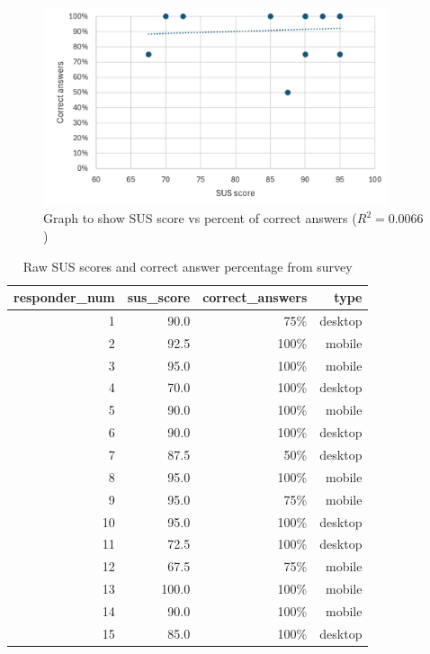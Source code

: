 \begin{figure}[H]
    \centering
    \includegraphics[width=0.9\textwidth]{contents/appendix/fig5/answer-sus-correlation.png}
    \caption{Graph to show SUS score vs percent of correct answers ($R^2 = 0.0066$)}
    \label{fig:sus-correlation}
\end{figure}

\begin{table}[ht]
  \centering
  \begin{tabular}{r r r r}
    \hline
    responder\_num & sus\_score & correct\_answers & type\\
    \hline
    1  &  90.0  & 75\%  & desktop\\
    2  &  92.5  & 100\% & mobile\\
    3  &  95.0  & 100\% & mobile\\
    4  &  70.0  & 100\% & desktop\\
    5  &  90.0  & 100\% & mobile\\
    6  &  90.0  & 100\% & desktop\\
    7  &  87.5  & 50\%  & desktop\\
    8  &  95.0  & 100\% & mobile\\
    9  &  95.0  & 75\%  & mobile\\
    10 &  95.0  & 100\% & desktop\\
    11 &  72.5  & 100\% & desktop\\
    12 &  67.5  & 75\%  & mobile\\
    13 & 100.0  & 100\% & mobile\\
    14 &  90.0  & 100\% & mobile\\
    15 &  85.0  & 100\% & desktop\\
    \hline
  \end{tabular}
  \caption{Raw SUS scores and correct answer percentage from survey}
  \label{tab:raw-sus}
\end{table}

